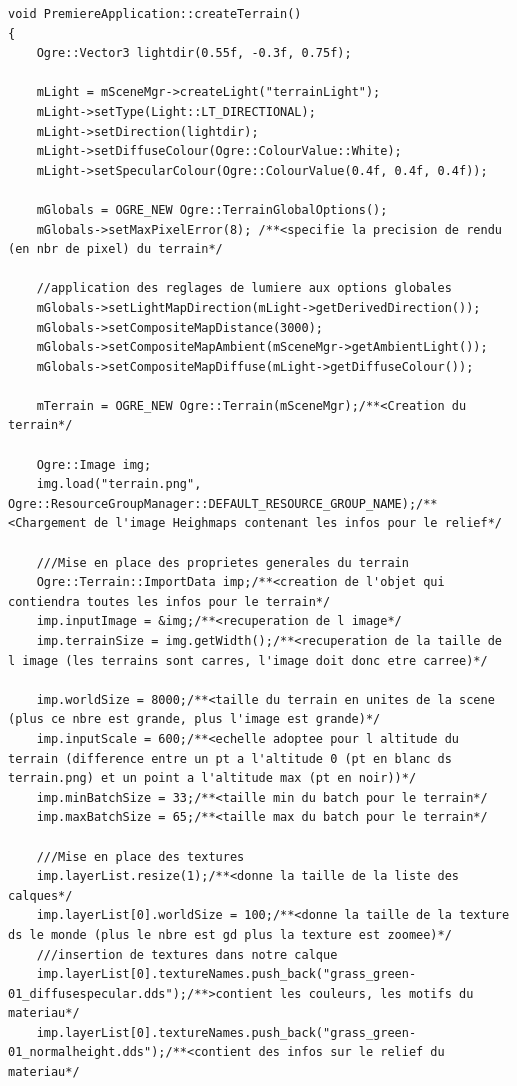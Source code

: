 \begin{lstlisting}[caption={createTerrain}]
void PremiereApplication::createTerrain()
{    
    Ogre::Vector3 lightdir(0.55f, -0.3f, 0.75f);
    
    mLight = mSceneMgr->createLight("terrainLight");
    mLight->setType(Light::LT_DIRECTIONAL);
    mLight->setDirection(lightdir);
    mLight->setDiffuseColour(Ogre::ColourValue::White);
    mLight->setSpecularColour(Ogre::ColourValue(0.4f, 0.4f, 0.4f)); 
    
    mGlobals = OGRE_NEW Ogre::TerrainGlobalOptions();
    mGlobals->setMaxPixelError(8); /**<specifie la precision de rendu (en nbr de pixel) du terrain*/    
    
    //application des reglages de lumiere aux options globales
    mGlobals->setLightMapDirection(mLight->getDerivedDirection());
    mGlobals->setCompositeMapDistance(3000);
    mGlobals->setCompositeMapAmbient(mSceneMgr->getAmbientLight());
    mGlobals->setCompositeMapDiffuse(mLight->getDiffuseColour());    
    
    mTerrain = OGRE_NEW Ogre::Terrain(mSceneMgr);/**<Creation du terrain*/
    
    Ogre::Image img;
    img.load("terrain.png", Ogre::ResourceGroupManager::DEFAULT_RESOURCE_GROUP_NAME);/**<Chargement de l'image Heighmaps contenant les infos pour le relief*/
    
    ///Mise en place des proprietes generales du terrain
    Ogre::Terrain::ImportData imp;/**<creation de l'objet qui contiendra toutes les infos pour le terrain*/
    imp.inputImage = &img;/**<recuperation de l image*/
    imp.terrainSize = img.getWidth();/**<recuperation de la taille de l image (les terrains sont carres, l'image doit donc etre carree)*/

    imp.worldSize = 8000;/**<taille du terrain en unites de la scene (plus ce nbre est grande, plus l'image est grande)*/
    imp.inputScale = 600;/**<echelle adoptee pour l altitude du terrain (difference entre un pt a l'altitude 0 (pt en blanc ds terrain.png) et un point a l'altitude max (pt en noir))*/
    imp.minBatchSize = 33;/**<taille min du batch pour le terrain*/
    imp.maxBatchSize = 65;/**<taille max du batch pour le terrain*/
    
    ///Mise en place des textures
    imp.layerList.resize(1);/**<donne la taille de la liste des calques*/
    imp.layerList[0].worldSize = 100;/**<donne la taille de la texture ds le monde (plus le nbre est gd plus la texture est zoomee)*/
    ///insertion de textures dans notre calque
    imp.layerList[0].textureNames.push_back("grass_green-01_diffusespecular.dds");/**>contient les couleurs, les motifs du materiau*/
    imp.layerList[0].textureNames.push_back("grass_green-01_normalheight.dds");/**<contient des infos sur le relief du materiau*/
    

\end{lstlisting}
